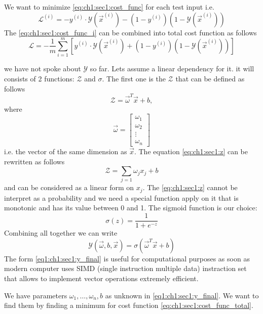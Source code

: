 We want to minimize \cref{eq:ch1:sec1:cost_func} for each test input i.e.
\begin{equation}
  \mathcal{L}^{(i)} = - y^{(i)} \cdot \mathcal{Y}\left(\vec{x}^{(i)}\right) -
(1-y^{(i)}) \left(1 - \mathcal{Y}\left(\vec{x}^{(i)}\right)\right)
  \label{eq:ch1:sec1:cost_func_i}
\end{equation}
The \cref{eq:ch1:sec1:cost_func_i} can be combined into total cost function as
follows
\begin{equation}
  \mathcal{L} = - \frac{1}{m} \sum_{i = 1}^{m} \left[ y^{(i)} \cdot \mathcal{Y}\left(\vec{x}^{(i)}\right) +
(1-y^{(i)}) \left(1 - \mathcal{Y}\left(\vec{x}^{(i)}\right)\right)\right]
  \label{eq:ch1:sec1:cost_func_total}
\end{equation}

we have not spoke about $\mathcal{Y}$ so far. Lets assume a linear dependency
for it. it will consists of 2 functions: $\mathcal{Z}$ and $\sigma$. The first
one is the $\mathcal{Z}$ that can be defined as follows
\begin{equation}
  \mathcal{Z} = \vec{\omega}^T \vec{x} + b,
  \label{eq:ch1:sec1:z}
\end{equation}
where
\[
\vec{\omega} =
\begin{bmatrix}
  \omega_{1} \\
  \omega_{2} \\
  \vdots \\
  \omega_{n}
\end{bmatrix}
\]
i.e. the vector of the same dimension as $\vec{x}$.
The equation \cref{eq:ch1:sec1:z} can be rewritten as follows
\[
\mathcal{Z} = \sum_{j = 1} \omega_j x_j +b
\]
and can be considered as a linear form on ${x_j}$. The \cref{eq:ch1:sec1:z}
cannot be interpret as a probability and we need a special function apply on it
that is monotonic \cite{wiki:monotonic_func} and has its value between 0 and
1. The sigmoid function is our choice:
\[
\sigma\left(z\right) = \frac{1}{1+e^{-z}}
\]
Combining all together we can write
\begin{equation}
  \mathcal{Y}\left(\vec{\omega}, b, \vec{x}\right) =
  \sigma\left(\vec{\omega}^T \vec{x} + b\right)
  \label{eq1:ch1:sec1:y_final}
\end{equation}
The form \cref{eq1:ch1:sec1:y_final} is useful for computational purposes as
soon as modern computer uses SIMD (single instruction multiple data) instraction
set that allows to implement vector operations extremely efficient.

We have parameters $\omega_1, \dots, \omega_n, b$ as unknown in
\cref{eq1:ch1:sec1:y_final}. We want to find them by finding a minimum for cost
function \cref{eq:ch1:sec1:cost_func_total}.

